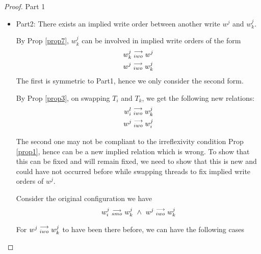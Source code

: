 \begin{proof}{Part 1}
\begin{itemize}
                        By Prop \ref{prop3}, swapping $T_i$ and $T_k$ to fix $\reln{w_k^l}{iwo}{w_i^j}$, gives us the following new relations.
                        \begin{align*}
                            \reln{w_i^l}{iwo}{w_k^j} \\
                            \reln{w^j}{iwo}{w_k^j}
                        \end{align*}
                        Both these relations repsect our irreflexivity constraint Prop \ref{prop1}. Thus, concluding this part. 

                    \item Part2: There exists an implied write order between another write $w^j$ and $w_k^j$. 

                        By Prop \ref{prop7}, $w_k^j$ can be involved in implied write orders of the form
                        \begin{align*}
                            w_k^j\stackrel{\longrightarrow}{_{iwo}}w^j \\
                            w^j\stackrel{\longrightarrow}{_{iwo}}w_k^j 
                        \end{align*}
                        The first is symmetric to Part1, hence we only consider the second form. 

                        By Prop \ref{prop3}, on swapping $T_i$ and $T_k$, we get the following new relations:
                        \begin{align*}
                            w_i^l\stackrel{\longrightarrow}{_{iwo}}w_k^j \\
                            w^j\stackrel{\longrightarrow}{_{iwo}}w_i^j
                        \end{align*}

                        The second one may not be compliant to the irreflexivity condition Prop \ref{prop1}, hence can be a new implied    relation which is wrong. To show that this can be fixed and will remain fixed, we need to show that this is new and could have not occurred before while swapping threads to fix implied write orders of $w^j$. 

                        Consider the original configuration we have 
                        \begin{align*}
                            \reln{w_i^j}{smo}{w_k^j} \ \wedge \ \reln{w^j}{iwo}{w_k^j}
                        \end{align*}

                        For $w^j\stackrel{\longrightarrow}{_{iwo}}w_k^j$ to have been there before, we can have the following cases 
                        

\end{itemize}
\end{proof}
